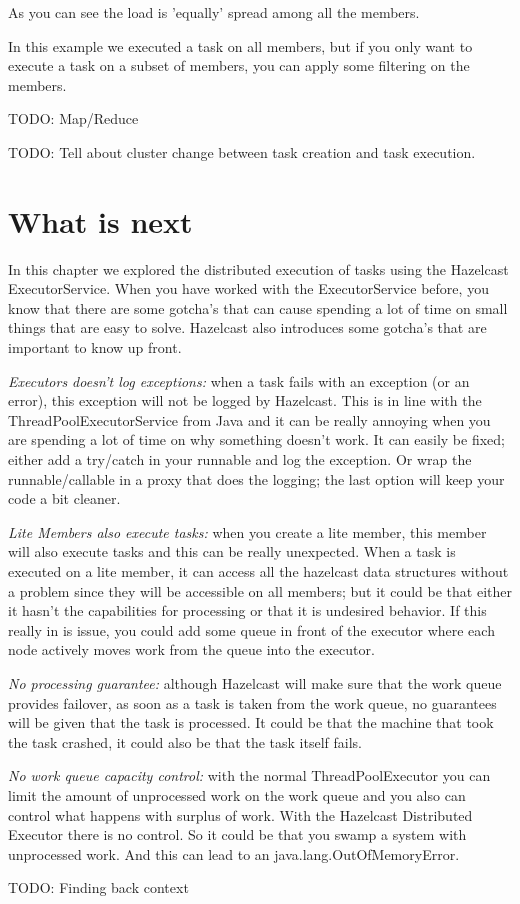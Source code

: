 As you can see the load is 'equally' spread among all the members. 

In this example we executed a task on all members, but if you only want to execute a task on a subset of members, you can apply some filtering on the members. 

TODO: Map/Reduce

TODO: Tell about cluster change between task creation and task execution.

\section{What is next}
In this chapter we explored the distributed execution of tasks using the Hazelcast ExecutorService. When you have worked with the ExecutorService before, you know that there are some gotcha's that can cause spending a lot of time on small things that are easy to solve. Hazelcast also introduces some gotcha's that are important to know up front.

\emph{Executors doesn't log exceptions:} when a task fails with an exception (or an error), this exception will not be logged by Hazelcast. This is in line with the ThreadPoolExecutorService from Java and it can be really annoying when you are spending a lot of time on why something doesn't work. It can easily be fixed; either add a try/catch in your runnable and log the exception. Or wrap the runnable/callable in a proxy that does the logging; the last option will keep your code a bit cleaner. 

\emph{Lite Members also execute tasks:} when you create a lite member, this member will also execute tasks and this can be really unexpected. When a task is executed on a lite member, it can access all the hazelcast data structures without a problem since they will be accessible on all members; but it could be that either it hasn't the capabilities for processing or that it is undesired behavior. If this really in is issue, you could add some queue in front of the executor where each node actively moves work from the queue into the executor.

\emph{No processing guarantee:} although Hazelcast will make sure that the work queue provides failover, as soon as a task is taken from the work queue, no guarantees will be given that the task is processed. It could be that the machine that took the task crashed, it could also be that the task itself fails. 

\emph{No work queue capacity control:} with the normal ThreadPoolExecutor you can limit the amount of unprocessed work on the work queue and you also can control what happens with surplus of work. With the Hazelcast Distributed Executor there is no control. So it could be that you swamp a system with unprocessed work. And this can lead to an java.lang.OutOfMemoryError.

TODO: Finding back context


